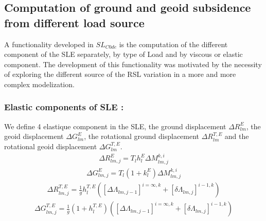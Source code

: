 \documentclass[letterpaper,10pt,english]{sphinxmanual}
\begin{document}
\subsection{Computation of ground and geoid subsidence from different load source}
\label{\detokenize{numerical_imp:computation-of-ground-and-geoid-subsidence-from-different-load-source}}\label{\detokenize{numerical_imp:g-r-comp}}
\sphinxAtStartPar
A functionality developed in \(SL_{C0de}\) is the computation of the different component of the SLE separately, by type of Load and by viscous or elastic component. The development of this functionality was motivated by the necessity of exploring the different source of the RSL variation in a more and more complex modelization.


\subsubsection{Elastic components of SLE :}
\label{\detokenize{numerical_imp:elastic-components-of-sle}}
\sphinxAtStartPar
We define 4 elastique component in the SLE, the ground displacement \(\Delta R^E_{lm}\), the geoid displacement \(\Delta G^E_{lm}\), the rotational ground displacement \(\Delta R^{T,E}_{lm}\) and the rotational geoid displacement \(\Delta G^{T,E}_{lm}\).
\begin{equation*}
\begin{split}\Delta R^E_{lm,j} = T_l h_l^E \Delta M_{lm,j}^{k,i}\end{split}
\end{equation*}\begin{equation*}
\begin{split}\Delta G^E_{lm,j} = T_l (1+k_l^E) \Delta M_{lm,j}^{k,i}\end{split}
\end{equation*}\begin{equation*}
\begin{split}\Delta R^{T,E}_{lm,j}=\frac{1}{g}h^{T,E}_l([\Delta \Lambda_{lm,j-1}]^{i=\infty,k} + [\delta \Lambda_{lm,j}]^{i-1,k})\end{split}
\end{equation*}\begin{equation*}
\begin{split}\Delta G^{T,E}_{lm,j}=\frac{1}{g}(1+h^{T,E}_l)([\Delta \Lambda_{lm,j-1}]^{i=\infty,k} + [\delta \Lambda_{lm,j}]^{i-1,k})\end{split}
\end{equation*}
\end{document}
